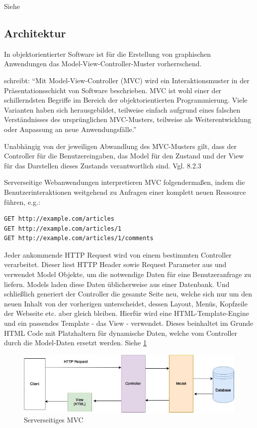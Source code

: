 Siehe \cite[Stateful Web Applications]{Parikh:2015}

\subsection{Architektur}

In objektorientierter Software ist für die Erstellung von graphischen Anwendungen das Model-View-Controller-Muster vorherrschend.

\cite{lahres2009objektorientierte} schreibt: \enquote{Mit Model-View-Controller (MVC) wird ein Interaktionsmuster in der Präsentationsschicht von Software beschrieben. MVC ist wohl einer der schillerndsten Begriffe im Bereich der objektorientierten Programmierung. Viele Varianten haben sich herausgebildet, teilweise einfach aufgrund eines falschen Verständnisses des ursprünglichen MVC-Musters, teilweise als Weiterentwicklung oder Anpassung an neue Anwendungsfälle.}

Unabhängig von der jeweiligen Abwandlung des MVC-Musters gilt, dass der Controller für die Benutzereingaben, das Model für den Zustand und der View für das Darstellen dieses Zustands verantwortlich sind. Vgl. \cite{lahres2009objektorientierte} 8.2.3

Serverseitige Webanwendungen interpretieren MVC folgendermaßen, indem die Benutzerinteraktionen weitgehend zu Anfragen einer komplett neuen Ressource führen, e.g.:

\begin{verbatim}
GET http://example.com/articles
GET http://example.com/articles/1
GET http://example.com/articles/1/comments
\end{verbatim}

Jeder ankommende HTTP Request wird von einem bestimmten Controller verarbeitet. Dieser liest HTTP Header sowie Request Parameter aus und verwendet Model Objekte, um die notwendige Daten für eine Benutzeranfrage zu liefern. Models laden diese Daten üblicherweise aus einer Datenbank. Und schließlich generiert der Controller die gesamte Seite neu, welche sich nur um den neuen Inhalt von der vorherigen unterscheidet, dessen Layout, Menüs, Kopfzeile der Webseite etc. aber gleich bleiben. Hierfür wird eine HTML-Template-Engine und ein passendes Template - das View - verwendet. Dieses beinhaltet im Grunde HTML Code mit Platzhaltern für dynamische Daten, welche vom Controller durch die Model-Daten ersetzt werden. Siehe \ref{fig:server_side_mvc}

\begin{figure}[htp]     %
\centering
\includegraphics[width=1.0\textwidth]{images/server_side_mvc}
\caption{Serverseitiges MVC}\label{fig:server_side_mvc}
\end{figure}

